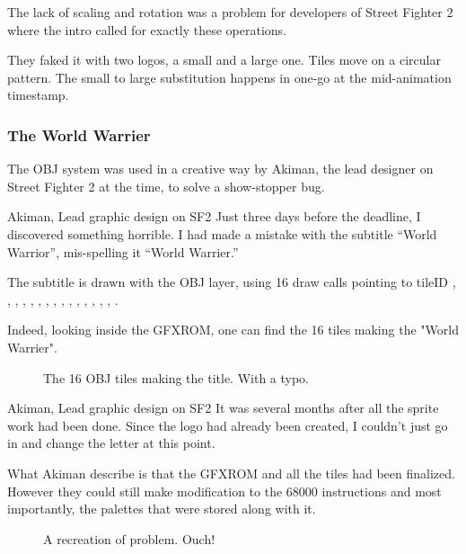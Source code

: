 The lack of scaling and rotation was a problem for developers of Street Fighter 2 where the intro called for exactly these operations. 

They faked it with two logos, a small and a large one. Tiles move on a circular pattern. The small to large substitution happens in one-go at the mid-animation timestamp.

\pagebreak

\subsubsection{The World Warrier}
The OBJ system was used in a creative way by Akiman, the lead designer on Street Fighter 2 at the time, to solve a show-stopper bug.

\begin{q}{Akiman, Lead graphic design on SF2}
Just three days before the deadline, I discovered something horrible. I had made a mistake with the subtitle “World Warrior”, mis-spelling it “World Warrier.”
\end{q}

The subtitle is drawn with the OBJ layer, using 16 draw calls pointing to tileID , , , , , , , , , , , , , , , . 

Indeed, looking inside the GFXROM, one can find the 16 tiles making the "World Warrier". 

\begin{figure}[H]
 \caption*{The 16 OBJ tiles making the title. With a typo.}%
 \end{figure}%

\begin{q}{Akiman, Lead graphic design on SF2}
It was several months after all the sprite work had been done. Since the logo had already been created, I couldn’t just go in and change the letter at this point.
\end{q}

What Akiman describe is that the GFXROM and all the tiles had been finalized. However they could still make modification to the 68000 instructions and most importantly, the palettes that were stored along with it.

\begin{figure}[H]
 \caption*{A recreation of problem. Ouch!}%
 \end{figure}%

